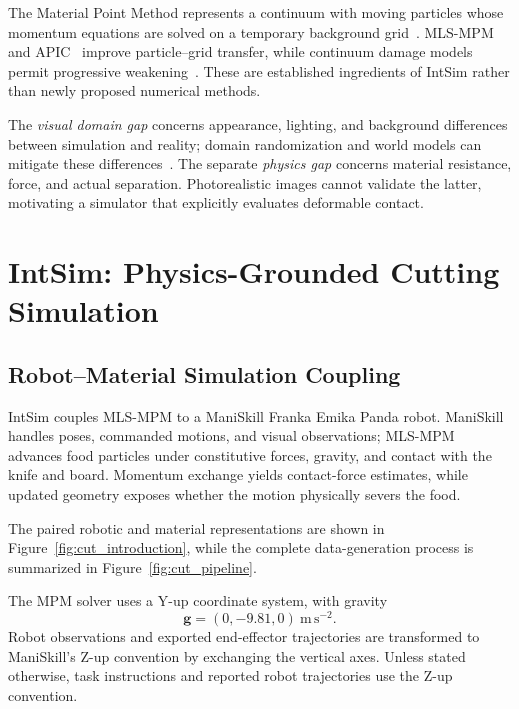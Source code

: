 The Material Point Method represents a continuum with moving particles whose momentum equations are solved on a temporary background grid~\citep{sulsky1994particle,2013-mpm}. MLS-MPM~\citep{2018-MLSMPM} and APIC~\citep{2015-APIC,jiang2017angular} improve particle--grid transfer, while continuum damage models permit progressive weakening~\citep{2019-cdmpm,10.1145/3340259}. These are established ingredients of IntSim rather than newly proposed numerical methods.

The \emph{visual domain gap} concerns appearance, lighting, and background differences between simulation and reality; domain randomization and world models can mitigate these differences~\citep{tobin2017domainrandomizationtransferringdeep,nvidia2025cosmosworldfoundationmodel}. The separate \emph{physics gap} concerns material resistance, force, and actual separation. Photorealistic images cannot validate the latter, motivating a simulator that explicitly evaluates deformable contact.

\FloatBarrier

\section{IntSim: Physics-Grounded Cutting Simulation}
\label{sec:cut_intsim}

\subsection{Robot--Material Simulation Coupling}
\label{subsec:cut_coupling}

IntSim couples MLS-MPM to a ManiSkill Franka Emika Panda robot. ManiSkill handles poses, commanded motions, and visual observations; MLS-MPM advances food particles under constitutive forces, gravity, and contact with the knife and board. Momentum exchange yields contact-force estimates, while updated geometry exposes whether the motion physically severs the food.

The paired robotic and material representations are shown in Figure~\ref{fig:cut_introduction}, while the complete data-generation process is summarized in Figure~\ref{fig:cut_pipeline}.

The MPM solver uses a Y-up coordinate system, with gravity
\begin{equation}
  \mathbf{g}=(0,-9.81,0)\ \mathrm{m\,s^{-2}}.
\end{equation}
Robot observations and exported end-effector trajectories are transformed to ManiSkill's Z-up convention by exchanging the vertical axes. Unless stated otherwise, task instructions and reported robot trajectories use the Z-up convention.


